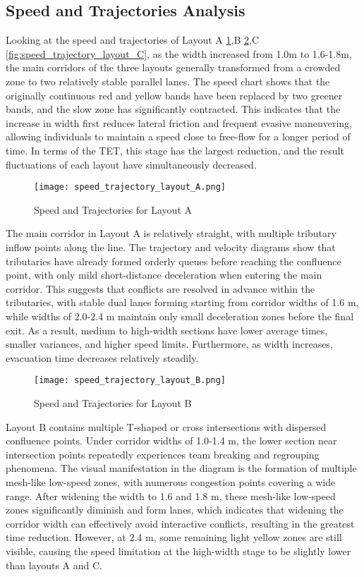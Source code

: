 \subsection{Speed and Trajectories Analysis}
Looking at the speed and trajectories of Layout A \ref{fig:speed_trajectory_layout_A},B \ref{fig:speed_trajectory_layout_B},C \ref{fig:speed_trajectory_layout_C}, as the width increased from 1.0m to 1.6-1.8m, the main corridors of the three layouts generally transformed from a crowded zone to two relatively stable parallel lanes. The speed chart shows that the originally continuous red and yellow bands have been replaced by two greener bands, and the slow zone has significantly contracted. This indicates that the increase in width first reduces lateral friction and frequent evasive maneuvering, allowing individuals to maintain a speed close to free-flow for a longer period of time. In terms of the TET, this stage has the largest reduction, and the result fluctuations of each layout have simultaneously decreased.

\begin{figure}[h]
    \centering
    \texttt{[image: speed\_trajectory\_layout\_A.png]}
    \caption{Speed and Trajectories for Layout A}
    \label{fig:speed_trajectory_layout_A}
\end{figure}

The main corridor in Layout A is relatively straight, with multiple tributary inflow points along the line. The trajectory and velocity diagrams show that tributaries have already formed orderly queues before reaching the confluence point, with only mild short-distance deceleration when entering the main corridor. This suggests that conflicts are resolved in advance within the tributaries, with stable dual lanes forming starting from corridor widths of 1.6 m, while widths of 2.0-2.4 m maintain only small deceleration zones before the final exit. As a result, medium to high-width sections have lower average times, smaller variances, and higher speed limits. Furthermore, as width increases, evacuation time decreases relatively steadily.

\begin{figure}[h]
    \centering
    \texttt{[image: speed\_trajectory\_layout\_B.png]}
    \caption{Speed and Trajectories for Layout B}
    \label{fig:speed_trajectory_layout_B}
\end{figure}

Layout B contains multiple T-shaped or cross intersections with dispersed confluence points. Under corridor widths of 1.0-1.4 m, the lower section near intersection points repeatedly experiences team breaking and regrouping phenomena. The visual manifestation in the diagram is the formation of multiple mesh-like low-speed zones, with numerous congestion points covering a wide range. After widening the width to 1.6 and 1.8 m, these mesh-like low-speed zones significantly diminish and form lanes, which indicates that widening the corridor width can effectively avoid interactive conflicts, resulting in the greatest time reduction. However, at 2.4 m, some remaining light yellow zones are still visible, causing the speed limitation at the high-width stage to be slightly lower than layouts A and C.

